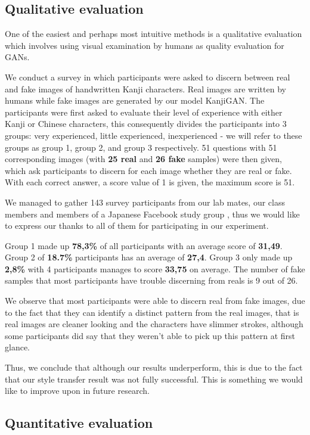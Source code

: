 \documentclass[12pt]{report}
\begin{document}
\subsection{Qualitative evaluation}
One of the easiest and perhaps most intuitive methods is a qualitative evaluation which involves using visual examination by humans as quality evaluation for GANs.

We conduct a survey in which participants were asked to discern between real and fake images of handwritten Kanji characters. Real images are written by humans while fake images are generated by our model KanjiGAN. The participants were first asked to evaluate their level of experience with either Kanji or Chinese characters, this consequently divides the participants into 3 groups: very experienced, little experienced, inexperienced - we will refer to these groups as group 1, group 2, and group 3 respectively. 51 questions with 51 corresponding images (with \textbf{25 real} and \textbf{26 fake} samples) were then given, which ask participants to discern for each image whether they are real or fake. With each correct answer, a score value of 1 is given, the maximum score is 51.

We managed to gather 143 survey participants from our lab mates, our class members and members of a Japanese Facebook study group \cite{fb-group}, thus we would like to express our thanks to all of them for participating in our experiment.

Group 1 made up \textbf{78,3\%} of all participants with an average score of \textbf{31,49}. Group 2 of \textbf{18.7\%} participants has an average of \textbf{27,4}. Group 3 only made up \textbf{2,8\%} with 4 participants manages to score \textbf{33,75} on average. The number of fake samples that most participants have trouble discerning from reals is 9 out of 26.

We observe that most participants were able to discern real from fake images, due to the fact that they can identify a distinct pattern from the real images, that is real images are cleaner looking and the characters have slimmer strokes, although some participants did say that they weren't able to pick up this pattern at first glance.

Thus, we conclude that although our results underperform, this is due to the fact that our style transfer result was not fully successful. This is something we would like to improve upon in future research.

\subsection{Quantitative evaluation}
\end{document}
